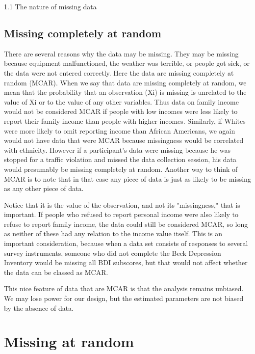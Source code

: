 1.1 The nature of missing data

\subsection{Missing completely at random}

There are several reasons why the data may be missing. They may be missing because equipment malfunctioned, the weather was terrible, or people got sick, or the data were not entered correctly. Here the data are missing completely at random (MCAR). When we say that data are missing completely at random, we mean that the probability that an observation (Xi) is missing is unrelated to the value of Xi or to the value of any other variables. Thus data on family income would not be considered MCAR if people with low incomes were less likely to report their family income than people with higher incomes. Similarly, if Whites were more likely to omit reporting income than African Americans, we again would not have data that were MCAR because missingness would be correlated with ethnicity. However if a participant's data were missing because he was stopped for a traffic violation and missed the data collection session, his data would presumably be missing completely at random. Another way to think of MCAR is to note that in that case any piece of data is just as likely to be missing as any other piece of data.

Notice that it is the value of the observation, and not its "missingness," that is important. If people who refused to report personal income were also likely to refuse to report family income, the data could still be considered MCAR, so long as neither of these had any relation to the income value itself. This is an important consideration, because when a data set consists of responses to several survey instruments, someone who did not complete the Beck Depression Inventory would be missing all BDI subscores, but that would not affect whether the data can be classed as MCAR. 

This nice feature of data that are MCAR is that the analysis remains unbiased. We may lose power for our design, but the estimated parameters are not biased by the absence of data.


 

\section{Missing at random}



